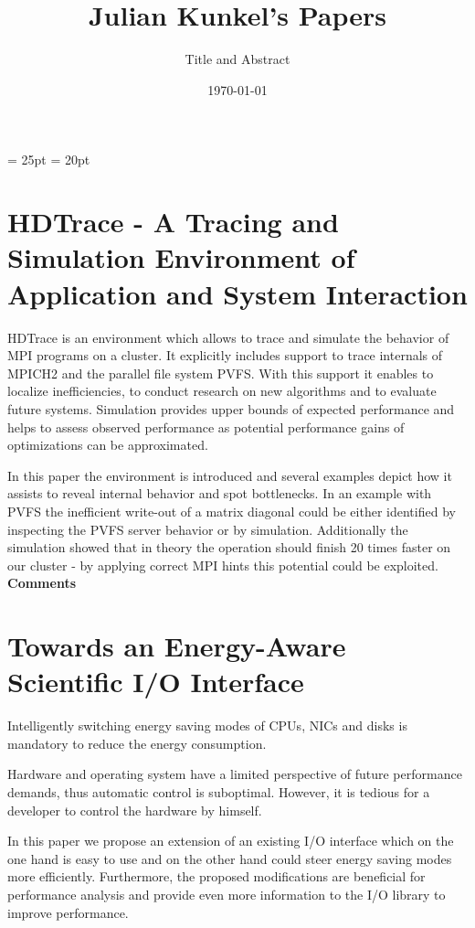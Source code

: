 \documentclass[a4paper,14pt]{extarticle}
\title{\espaco\\[3cm] \huge Julian Kunkel's Papers\\[5cm]}
\author{\LARGE Title and Abstract\\[3cm]}
\date{\today}
\newcommand{\espaco}{\hspace{16pt}}
\begin{document}
\maketitle

\parskip = 25pt
\baselineskip = 20pt

\clearpage

\section{HDTrace - A Tracing and Simulation Environment of Application and System Interaction}

\espaco
HDTrace is an environment which allows to
trace and simulate the behavior of MPI programs on a
cluster. It explicitly includes support to trace internals
of MPICH2 and the parallel file system PVFS. With
this support it enables to localize inefficiencies, to conduct research on new algorithms and to evaluate future
systems. Simulation provides upper bounds of expected
performance and helps to assess observed performance
as potential performance gains of optimizations can be
approximated.

In this paper the environment is introduced and
several examples depict how it assists to reveal internal behavior and spot bottlenecks. In an example with
PVFS the inefficient write-out of a matrix diagonal
could be either identified by inspecting the PVFS server
behavior or by simulation. Additionally the simulation
showed that in theory the operation should finish 20
times faster on our cluster - by applying correct MPI
hints this potential could be exploited.\\[1cm]

{\bf Comments}

\clearpage

\section{Towards an Energy-Aware Scientific I/O Interface}

\espaco
Intelligently switching energy saving modes
of CPUs, NICs and disks is mandatory to reduce the
energy consumption. 

Hardware and operating system have a limited perspective of future performance demands, thus automatic
control is suboptimal. However, it is tedious for a developer to control the hardware by himself.

In this paper we propose an extension of an existing I/O interface which on the one hand is easy to use
and on the other hand could steer energy saving modes
more efficiently. Furthermore, the proposed modifications are beneficial for performance analysis and provide even more information to the I/O library to improve performance.
\end{document}
